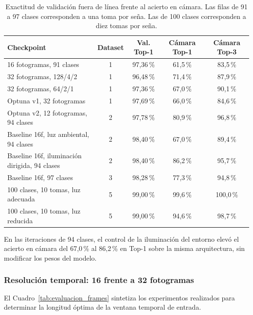 \begin{table}[H]
    \centering
    \small
    \caption{Exactitud de validación fuera de línea frente al acierto en cámara. Las filas de 91 a 97 clases corresponden a una toma por seña. Las de 100 clases corresponden a diez tomas por seña.}
    \label{tab:brecha_offline_camara}
    \begin{tabularx}{\linewidth}{Xcccc}
        \toprule
        \textbf{Checkpoint} & \textbf{Dataset} & \textbf{Val. Top-1} & \textbf{Cámara Top-1} & \textbf{Cámara Top-3} \\
        \midrule
        16 fotogramas, 91 clases & 1 & 97{,}36\,\% & 61{,}5\,\% & 83{,}5\,\% \\
        32 fotogramas, 128/4/2 & 1 & 96{,}48\,\% & 71{,}4\,\% & 87{,}9\,\% \\
        32 fotogramas, 64/2/1 & 1 & 97{,}36\,\% & 67{,}0\,\% & 90{,}1\,\% \\
        Optuna v1, 32 fotogramas & 1 & 97{,}69\,\% & 66{,}0\,\% & 84{,}6\,\% \\
        Optuna v2, 12 fotogramas, 94 clases & 2 & 97{,}78\,\% & 80{,}9\,\% & 96{,}8\,\% \\
        Baseline 16f, luz ambiental, 94 clases & 2 & 98{,}40\,\% & 67{,}0\,\% & 89{,}4\,\% \\
        Baseline 16f, iluminación dirigida, 94 clases & 2 & 98{,}40\,\% & 86{,}2\,\% & 95{,}7\,\% \\
        Baseline 16f, 97 clases & 3 & 98{,}28\,\% & 77{,}3\,\% & 94{,}8\,\% \\
        100 clases, 10 tomas, luz adecuada & 5 & 99{,}00\,\% & 99{,}6\,\% & 100{,}0\,\% \\
        100 clases, 10 tomas, luz reducida & 5 & 99{,}00\,\% & 94{,}6\,\% & 98{,}7\,\% \\
        \bottomrule
    \end{tabularx}
\end{table}

En las iteraciones de 94 clases, el control de la iluminación del entorno elevó el acierto en cámara del 67{,}0\,\% al 86{,}2\,\% en Top-1 sobre la misma arquitectura, sin modificar los pesos del modelo.

\subsubsection{Resolución temporal: 16 frente a 32 fotogramas}
El Cuadro~\ref{tab:evaluacion_frames} sintetiza los experimentos realizados para determinar la longitud óptima de la ventana temporal de entrada.

